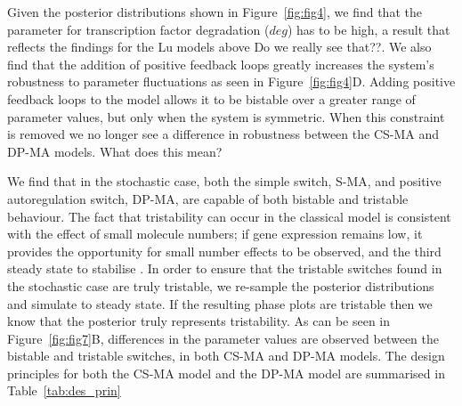 Given the posterior distributions shown in Figure~\ref{fig:fig4}, we find that the parameter for transcription factor degradation ($deg$) has to be high, a result that reflects the findings for the Lu models above {\color{red} Do we really see that??}. We also find that the addition of positive feedback loops greatly increases the system's robustness to parameter fluctuations as seen in Figure~\ref{fig:fig4}D. Adding positive feedback loops to the model allows it to be bistable over a greater range of parameter values, but only when the system is symmetric. When this constraint is removed we no longer see a difference in robustness between the CS-MA and DP-MA models. {\color{red} What does this mean? }



We find that in the stochastic case, both the simple switch, S-MA, and positive autoregulation switch, DP-MA, are capable of both bistable and tristable behaviour. The fact that tristability can occur in the classical model is consistent with the effect of small molecule numbers; if gene expression remains low, it provides the opportunity for small number effects to be observed, and the third steady state to stabilise \autocite{Ma:2012dt}. In order to ensure that the tristable switches found in the stochastic case are truly tristable, we re-sample the posterior distributions and simulate to steady state. If the resulting phase plots are tristable then we know that the posterior truly represents tristability. As can be seen in Figure~\ref{fig:fig7}B, differences in the parameter values are observed between the bistable and tristable switches, in both CS-MA and DP-MA models. The design principles for both the CS-MA model and the DP-MA model are summarised in Table~\ref{tab:des_prin}

